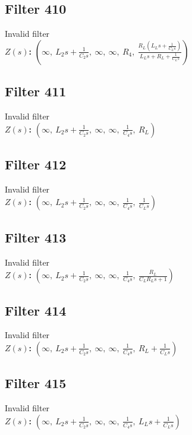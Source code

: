 \documentclass{article}
\begin{document}
\subsection*{Filter 410}
Invalid filter \\ 
\textbf{$Z(s)$:} $\left( \infty, \  L_{2} s + \frac{1}{C_{2} s}, \  \infty, \  \infty, \  R_{4}, \  \frac{R_{L} \left(L_{L} s + \frac{1}{C_{L} s}\right)}{L_{L} s + R_{L} + \frac{1}{C_{L} s}}\right)$ \\ 
\subsection*{Filter 411}
Invalid filter \\ 
\textbf{$Z(s)$:} $\left( \infty, \  L_{2} s + \frac{1}{C_{2} s}, \  \infty, \  \infty, \  \frac{1}{C_{4} s}, \  R_{L}\right)$ \\ 
\subsection*{Filter 412}
Invalid filter \\ 
\textbf{$Z(s)$:} $\left( \infty, \  L_{2} s + \frac{1}{C_{2} s}, \  \infty, \  \infty, \  \frac{1}{C_{4} s}, \  \frac{1}{C_{L} s}\right)$ \\ 
\subsection*{Filter 413}
Invalid filter \\ 
\textbf{$Z(s)$:} $\left( \infty, \  L_{2} s + \frac{1}{C_{2} s}, \  \infty, \  \infty, \  \frac{1}{C_{4} s}, \  \frac{R_{L}}{C_{L} R_{L} s + 1}\right)$ \\ 
\subsection*{Filter 414}
Invalid filter \\ 
\textbf{$Z(s)$:} $\left( \infty, \  L_{2} s + \frac{1}{C_{2} s}, \  \infty, \  \infty, \  \frac{1}{C_{4} s}, \  R_{L} + \frac{1}{C_{L} s}\right)$ \\ 
\subsection*{Filter 415}
Invalid filter \\ 
\textbf{$Z(s)$:} $\left( \infty, \  L_{2} s + \frac{1}{C_{2} s}, \  \infty, \  \infty, \  \frac{1}{C_{4} s}, \  L_{L} s + \frac{1}{C_{L} s}\right)$ \\ 
\end{document}
